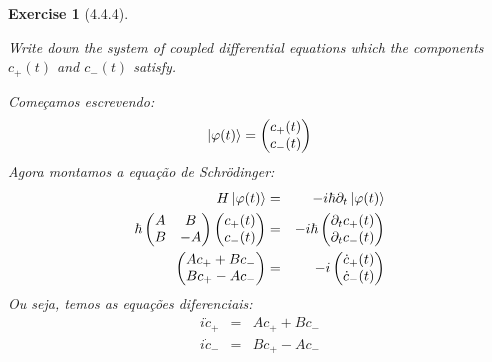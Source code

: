 \documentclass[12pt]{article}
\def\be{\begin{equation}}
\def\ee{\end{equation}}
\def\bea{\begin{eqnarray*}}
\def\eea{\end{eqnarray*}}
\def\beaa{\begin{eqnarray}}
\def\eeaa{\end{eqnarray}}
\newtheorem{exercise}{Exercise}
\begin{document}
\begin{exercise}[4.4.4]
\begin{exercises}
		Write down the system of coupled differential equations which the components $c_{+}(t)$ and $c_{-}(t)$ satisfy.
		\begin{multianswer}
				Começamos escrevendo:
				\be
					\ket{\varphi(t)} = \begin{pmatrix}
						c_+(t) \\ c_-(t)
						\end{pmatrix}
				\ee
				Agora montamos a equação de Schrödinger:
				\bea
					H\ket{\varphi(t)} &=& -i\hbar \partial_t\ket{\varphi(t)} \\
					\hbar\begin{pmatrix}
						A & B \\
						B & -A
					\end{pmatrix} 
					\begin{pmatrix}
						c_+(t) \\ c_-(t)
					\end{pmatrix} 
					&=& 
					-i\hbar 
					\begin{pmatrix}
						\partial_t c_+(t) \\ \partial_t c_-(t)
					\end{pmatrix} \\
					\begin{pmatrix}
						Ac_+ + Bc_- \\ Bc_+ - Ac_-
					\end{pmatrix}
					&=&
					-i \begin{pmatrix}
						\dot{c}_+(t) \\ \dot{c}_-(t)
					\end{pmatrix}
				\eea
			Ou seja, temos as equações diferenciais:
			\beaa
				i\dot{c}_+ &=& Ac_+ + Bc_- \\
				i\dot{c}_- &=& Bc_+ - Ac_-
			\eeaa				
		\end{multianswer}
		

\end{exercises}
\end{exercise}
\end{document}
